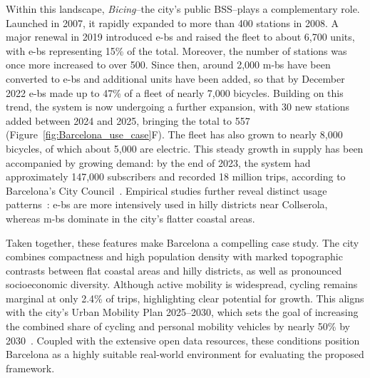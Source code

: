 Within this landscape, \textit{Bicing}--the city's public BSS--plays a complementary role. Launched in 2007, it rapidly expanded to more than 400 stations in 2008. A major renewal in 2019 introduced \acp{e-b} and raised the fleet to about 6,700 units, with \acp{e-b} representing 15\% of the total. Moreover, the number of stations was once more increased to over 500. Since then, around 2,000 \acp{m-b} have been converted to \acp{e-b} and additional units have been added, so that by December 2022 \acp{e-b} made up to 47\% of a fleet of nearly 7,000 bicycles. Building on this trend, the system is now undergoing a further expansion, with 30 new stations added between 2024 and 2025, bringing the total to 557 (Figure~\ref{fig:Barcelona_use_case}F). The fleet has also grown to nearly 8,000 bicycles, of which about 5,000 are electric. This steady growth in supply has been accompanied by growing demand: by the end of 2023, the system had approximately 147,000 subscribers and recorded 18 million trips, according to Barcelona's City Council~\cite{AjuntamentBarcelona2024_Bicing}. Empirical studies further reveal distinct usage patterns~\cite{Grau-Escolano2024}: \acp{e-b} are more intensively used in hilly districts near Collserola, whereas \acp{m-b} dominate in the city’s flatter coastal areas.

Taken together, these features make Barcelona a compelling case study. The city combines compactness and high population density with marked topographic contrasts between flat coastal areas and hilly districts, as well as pronounced socioeconomic diversity. Although active mobility is widespread, cycling remains marginal at only 2.4\% of trips, highlighting clear potential for growth. This aligns with the city’s Urban Mobility Plan 2025–2030, which sets the goal of increasing the combined share of cycling and personal mobility vehicles by nearly 50\% by 2030~\cite{PMU2025}. Coupled with the extensive open data resources, these conditions position Barcelona as a highly suitable real-world environment for evaluating the proposed framework.